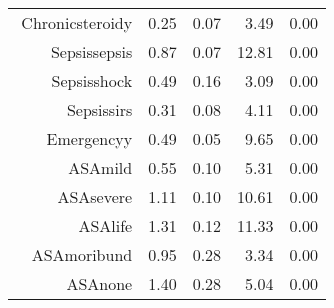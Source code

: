 \begin{tabular}{rrrrr}
$$  Chronic\-steroid\-y & 0.25 & 0.07 & 3.49 & 0.00 \\ 
  Sepsis\-sepsis & 0.87 & 0.07 & 12.81 & 0.00 \\ 
  Sepsis\-shock & 0.49 & 0.16 & 3.09 & 0.00 \\ 
  Sepsis\-sirs & 0.31 & 0.08 & 4.11 & 0.00 \\ 
  Emergency\-y & 0.49 & 0.05 & 9.65 & 0.00 \\ 
  ASA\-mild & 0.55 & 0.10 & 5.31 & 0.00 \\ 
  ASA\-severe & 1.11 & 0.10 & 10.61 & 0.00 \\ 
  ASA\-life & 1.31 & 0.12 & 11.33 & 0.00 \\ 
  ASA\-moribund & 0.95 & 0.28 & 3.34 & 0.00 \\ 
  ASA\-none & 1.40 & 0.28 & 5.04 & 0.00 \\ 
   \hline
\end{tabular}

